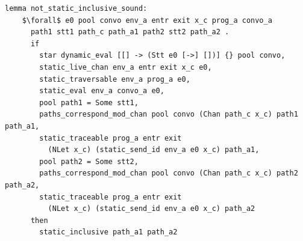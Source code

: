 \documentclass{article}
\begin{document}
\begin{lstlisting}[language=logic, mathescape]
  lemma not_static_inclusive_sound:
    $\forall$ e0 pool convo env_a entr exit x_c prog_a convo_a
      path1 stt1 path_c path_a1 path2 stt2 path_a2 .
      if
        star dynamic_eval [[] -> (Stt e0 [->] [])] {} pool convo, 
        static_live_chan env_a entr exit x_c e0, 
        static_traversable env_a prog_a e0, 
        static_eval env_a convo_a e0, 
        pool path1 = Some stt1, 
        paths_correspond_mod_chan pool convo (Chan path_c x_c) path1 path_a1, 
        static_traceable prog_a entr exit
          (NLet x_c) (static_send_id env_a e0 x_c) path_a1, 
        pool path2 = Some stt2, 
        paths_correspond_mod_chan pool convo (Chan path_c x_c) path2 path_a2, 
        static_traceable prog_a entr exit
          (NLet x_c) (static_send_id env_a e0 x_c) path_a2
      then
        static_inclusive path_a1 path_a2
  \end{lstlisting}

  
\end{document}
